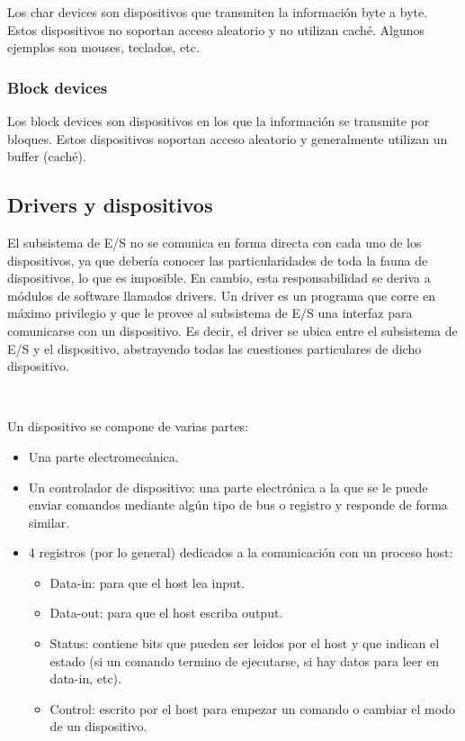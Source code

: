 \documentclass{article}
\begin{document}
Los char devices son dispositivos que transmiten la informaci\'on byte a byte. Estos dispositivos no soportan acceso aleatorio y no utilizan cach\'e. Algunos ejemplos son mouses, teclados, etc.

\subsubsection{Block devices}

Los block devices son dispositivos en los que la informaci\'on se transmite por bloques. Estos dispositivos soportan acceso aleatorio y generalmente utilizan un buffer (cach\'e).

\subsection{Drivers y dispositivos}

El subsistema de E/S no se comunica en forma directa con cada uno de los dispositivos, ya que debería conocer las particularidades de toda la fauna de dispositivos, lo que es imposible. En cambio, esta responsabilidad se deriva a módulos de software llamados drivers. Un driver es un programa que corre en máximo privilegio y que le provee al subsistema de E/S una interfaz para comunicarse con un dispositivo. Es decir, el driver se ubica entre el subsistema de E/S y el dispositivo, abstrayendo todas las cuestiones particulares de dicho dispositivo.

~

Un dispositivo se compone de varias partes:

\begin{itemize}
 \item Una parte electromecánica.
 \item Un controlador de dispositivo: una parte electrónica a la que se le puede enviar comandos mediante algún tipo de bus o registro y responde de forma similar.
 \item 4 registros (por lo general) dedicados a la comunicación con un proceso host:
 \begin{itemize}
  \item Data-in: para que el host lea input.
  \item Data-out: para que el host escriba output.
  \item Status: contiene bits que pueden ser leidos por el host y que indican el estado (si un comando termino de ejecutarse, si hay datos para leer en data-in, etc).
  \item Control: escrito por el host para empezar un comando o cambiar el modo de un dispositivo.
 \end{itemize}

\end{itemize}
\end{document}
